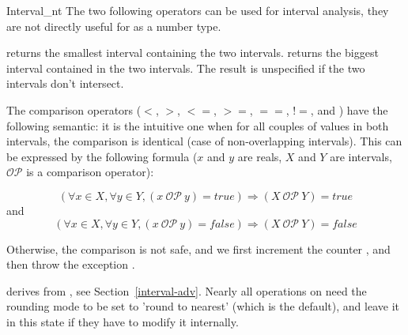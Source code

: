 \begin{ccClass} {Interval_nt}
The two following operators can be used for interval analysis, they are not
directly useful for  as a number type.

 {returns the smallest
interval containing the two intervals.}
 {returns the biggest
interval contained in the two intervals.  The result is unspecified if
the two intervals don't intersect.}


The comparison operators ($<$, $>$, $<=$, $>=$, $==$, $!=$, 
and ) have the following semantic: it is the intuitive
one when for all couples of values in both intervals, the comparison
is identical (case of non-overlapping intervals).  This can be expressed
by the following formula ($x$ and $y$ are reals, $X$ and $Y$ are
intervals, $\mathcal{OP}$ is a comparison operator):

$$
\left(\forall x \in X, \forall y \in Y, (x\ \mathcal{OP}\ y) = true\right)
\Rightarrow (X\ \mathcal{OP}\ Y) = true
$$
and
$$
\left(\forall x \in X, \forall y \in Y, (x\ \mathcal{OP}\ y) = false\right)
\Rightarrow (X\ \mathcal{OP}\ Y) =false
$$

Otherwise, the comparison is not safe, and we first increment the counter
, and then throw the exception
.

\ccImplementation

 derives from , 
see Section~\ref{interval-adv}.  Nearly all operations on
 need the rounding mode to be set to 'round to nearest'
(which is the default),
and leave it in this state if they have to modify it internally.

\end{ccClass}

